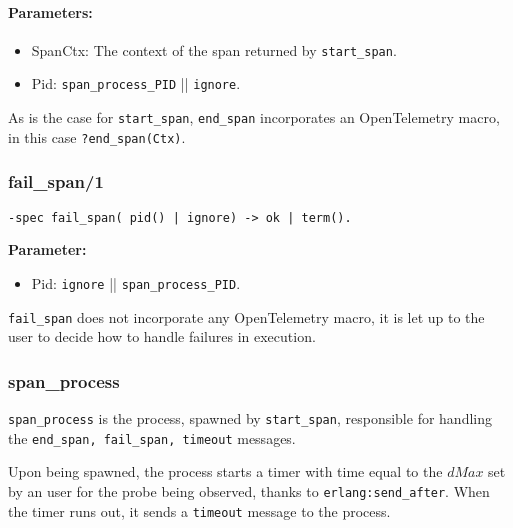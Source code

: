             \paragraph{Parameters:}
            \begin{itemize}
                \item SpanCtx: The context of the span returned by \texttt{start\_span}.
                \item Pid: \texttt{span\_process\_PID} || \texttt{ignore}.
            \end{itemize}

    As is the case for \texttt{start\_span}, \texttt{end\_span} incorporates an OpenTelemetry macro, in this case \texttt{?end\_span(Ctx)}. \\

        \subsubsection{fail\_span/1}
        \begin{verbatim}        
-spec fail_span( pid() | ignore) -> ok | term().
        \end{verbatim}

        \textbf{Parameter:}
             \begin{itemize}
                \item Pid: \texttt{ignore} || \texttt{span\_process\_PID}.
            \end{itemize}
            \texttt{fail\_span} does not incorporate any OpenTelemetry macro, it is let up to the user to decide how to handle failures in execution.
        \subsubsection{span\_process}
            \texttt{span\_process} is the process, spawned by \texttt{start\_span}, responsible for handling the \texttt{end\_span, fail\_span, timeout} messages.

            Upon being spawned, the process starts a timer with time equal to the $dMax$ set by an user for the probe being observed, thanks to \texttt{erlang:send\_after}. When the timer runs out, it sends a \texttt{timeout} message to the process.
        
